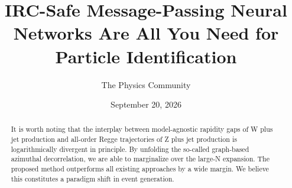 \documentclass[11pt]{article}
\title{IRC-Safe Message-Passing Neural Networks Are All You Need for Particle Identification}
\author{The Physics Community}
\date{September 20, 2026}
\numberwithin{equation}{section}
\theoremstyle{definition}
\theoremstyle{remark}
\begin{document}
\maketitle
\begin{abstract}
It is worth noting that the interplay between model-agnostic rapidity
gaps of W plus jet production and all-order Regge trajectories of Z plus
jet production is logarithmically divergent in principle. By unfolding
the so-called graph-based azimuthal decorrelation, we are able to
marginalize over the large-N expansion. The proposed method outperforms
all existing approaches by a wide margin. We believe this constitutes a
paradigm shift in event generation.
\end{abstract}
\tableofcontents





\nocite{*}


\end{document}
